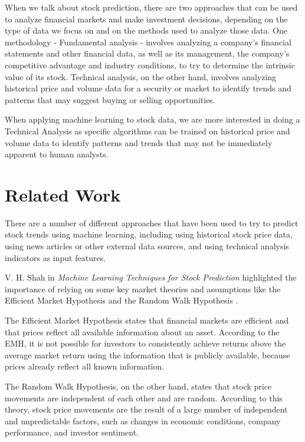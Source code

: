 \documentclass[conference,compsoc]{IEEEtran}
\begin{document}
When we talk about stock prediction, there are two approaches that can be used to analyze financial markets and make investment decisions, depending on the type of data we focus on and on the methods used to analyze those data.
%
One methodology - Fundamental analysis - involves analyzing a company's financial statements and other financial data, as well as its management, the company's competitive advantage and industry conditions, to try to determine the intrinsic value of its stock.
%
Technical analysis, on the other hand, involves analyzing historical price and volume data for a security or market to identify trends and patterns that may suggest buying or selling opportunities. 

When applying machine learning to stock data, we are more interested in doing a Technical Analysis as specific algorithms can be trained on historical price and volume data to identify patterns and trends that may not be immediately apparent to human analysts.

\section{Related Work}
There are a number of different approaches that have been used to try to predict stock trends using machine learning, including using historical stock price data, using news articles or other external data sources, and using technical analysis indicators as input features.

V. H. Shah in \textit{Machine Learning Techniques for Stock Prediction} highlighted the importance of relying on some key market theories and assumptions like the Efficient Market Hypothesis and the Random Walk Hypothesis \citep{shah2007machine}.

The Efficient Market Hypothesis states that financial markets are efficient and that prices reflect all available information about an asset.
%
According to the EMH, it is not possible for investors to consistently achieve returns above the average market return using the information that is publicly available, because prices already reflect all known information.

The Random Walk Hypothesis, on the other hand, states that stock price movements are independent of each other and are random.
%
According to this theory, stock price movements are the result of a large number of independent and unpredictable factors, such as changes in economic conditions, company performance, and investor sentiment.
\end{document}
